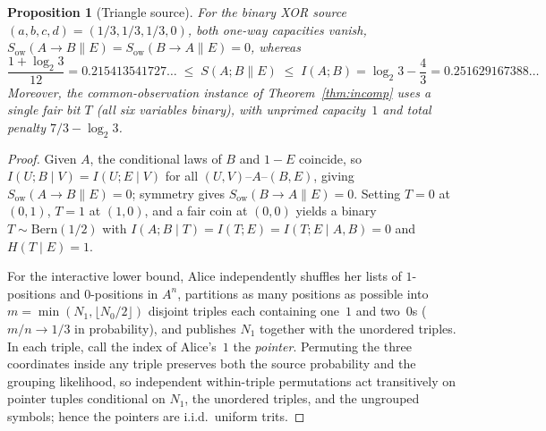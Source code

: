 \documentclass[11pt]{article}
\theoremstyle{plain}
\newtheorem{proposition}[theorem]{Proposition}
\theoremstyle{definition}
\theoremstyle{remark}
\newcommand{\Sow}{S_{\mathrm{ow}}}
\newcommand{\mkv}{\text{--}}
\begin{document}
\begin{proposition}[Triangle source]\label{prop:triangle}
For the binary XOR source $(a, b, c, d) = (1/3, 1/3, 1/3, 0)$, both one-way capacities vanish, $\Sow(A \to B \| E) = \Sow(B \to A \| E) = 0$, whereas
\[
\frac{1 + \log_2 3}{12} = 0.215413541727\ldots \;\le\; S(A; B \| E) \;\le\; I(A; B) = \log_2 3 - \frac{4}{3} = 0.251629167388\ldots
\]
Moreover, the common-observation instance of Theorem~\ref{thm:incomp} uses a single fair bit $T$ (all six variables binary), with unprimed capacity~$1$ and total penalty $7/3 - \log_2 3$.
\end{proposition}

\begin{proof}
Given $A$, the conditional laws of $B$ and $1 - E$ coincide, so $I(U; B \mid V) = I(U; E \mid V)$ for all $(U, V) \mkv A \mkv (B, E)$, giving $\Sow(A \to B \| E) = 0$; symmetry gives $\Sow(B \to A \| E) = 0$.
Setting $T = 0$ at $(0, 1)$, $T = 1$ at $(1, 0)$, and a fair coin at $(0, 0)$ yields a binary $T \sim \mathrm{Bern}(1/2)$ with $I(A; B \mid T) = I(T; E) = I(T; E \mid A, B) = 0$ and $H(T \mid E) = 1$.

For the interactive lower bound, Alice independently shuffles her lists of $1$-positions and $0$-positions in $A^n$, partitions as many positions as possible into $m = \min(N_1, \lfloor N_0 / 2 \rfloor)$ disjoint triples each containing one~$1$ and two~$0$s ($m/n \to 1/3$ in probability), and publishes $N_1$ together with the unordered triples.
In each triple, call the index of Alice's~$1$ the \emph{pointer}.
Permuting the three coordinates inside any triple preserves both the source probability and the grouping likelihood, so independent within-triple permutations act transitively on pointer tuples conditional on $N_1$, the unordered triples, and the ungrouped symbols; hence the pointers are i.i.d.\ uniform trits.


\end{proof}
\end{document}
